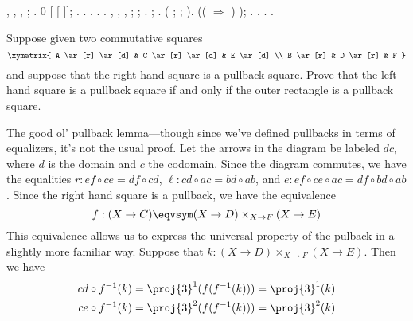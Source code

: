 \begin{coqdoccode}
\coqdocemptyline
\coqdocindent{1.00em}
 , , , ; .\coqdoceol
\coqdocindent{1.00em}
 0  [ [ ]]; . . .\coqdoceol
\coqdocindent{1.00em}
 \coqdocnotation{(} .\coqdoceol
\coqdocindent{1.00em}
 .\coqdoceol
\coqdocemptyline
\coqdocindent{1.00em}
 , , , ;  ; .\coqdoceol
\coqdocindent{1.00em}
 ;  .\coqdoceol
\coqdocindent{1.00em}
 ( ; \coqdoctac{\ensuremath{\exists}} ; ).\coqdoceol
\coqdocindent{1.00em}
 \coqdocnotation{(}   ((  \ensuremath{\Rightarrow} \coqdocnotation{(} ) ); .\coqdoceol
\coqdocindent{1.00em}
 .\coqdoceol
\coqdocnoindent
{}.\coqdoceol
\coqdocemptyline
\coqdocnoindent
{} .\coqdoceol
\coqdocemptyline
\end{coqdoccode}
Suppose given two commutative squares
\[\xymatrix{
  A \ar[r] \ar[d] & C \ar[r] \ar[d] & E \ar[d] \\
  B \ar[r] & D \ar[r] & F
}\]
and suppose that the right-hand square is a pullback square.  Prove that the
left-hand square is a pullback square if and only if the outer rectangle is a
pullback square.


 \soln
The good ol' pullback lemma---though since we've defined pullbacks in terms of
equalizers, it's not the usual proof.  Let the arrows in the diagram be labeled
$dc$, where $d$ is the domain and $c$ the codomain.  Since the diagram
commutes, we have the equalities $r : ef \circ ce = df \circ cd$, 
$\ell : cd \circ ac = bd \circ ab$, and $e : ef \circ ce \circ ac = df \circ bd
\circ ab$.  Since the right hand square is a pullback, we have the equivalence
\[
  f : (X \to C) \eqvsym (X \to D) \times_{X \to F} (X \to E)
\]
This equivalence allows us to express the universal property of the pulback in
a slightly more familiar way.  Suppose that $k : (X \to D) \times_{X \to F}
(X \to E)$.  Then we have
\begin{align*}
  cd \circ f^{-1}(k) &= \proj{3}^{1}(f(f^{-1}(k))) = \proj{3}^{1}(k) \\
  ce \circ f^{-1}(k) &= \proj{3}^{2}(f(f^{-1}(k))) = \proj{3}^{2}(k)
\end{align*}


